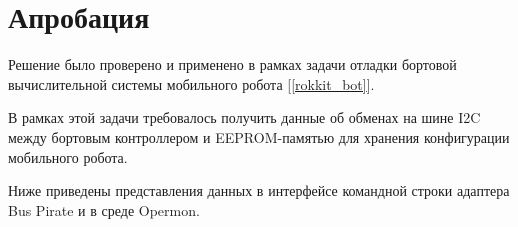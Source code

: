 \section{Апробация}

Решение было проверено и применено в рамках задачи отладки бортовой вычислительной системы мобильного робота [\ref{rokkit_bot}].

В рамках этой задачи требовалось получить данные об обменах на шине I2C между бортовым контроллером и EEPROM-памятью для хранения конфигурации мобильного робота.

Ниже приведены представления данных в интерфейсе командной строки адаптера Bus Pirate и в среде Opermon.